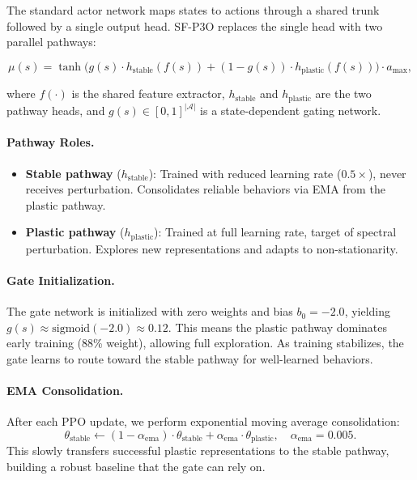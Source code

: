 \documentclass{article}
\begin{document}
The standard actor network maps states to actions through a shared trunk followed by a single output head. SF-P3O replaces the single head with two parallel pathways:

\begin{equation}
    \mu(s) = \tanh\!\Big(g(s) \cdot h_{\text{stable}}(f(s)) + (1 - g(s)) \cdot h_{\text{plastic}}(f(s))\Big) \cdot a_{\max},
    \label{eq:dual_pathway}
\end{equation}

where $f(\cdot)$ is the shared feature extractor, $h_{\text{stable}}$ and $h_{\text{plastic}}$ are the two pathway heads, and $g(s) \in [0,1]^{|\mathcal{A}|}$ is a state-dependent gating network.

\paragraph{Pathway Roles.}
\begin{itemize}
    \item \textbf{Stable pathway} ($h_{\text{stable}}$): Trained with reduced learning rate ($0.5\times$), never receives perturbation. Consolidates reliable behaviors via EMA from the plastic pathway.
    \item \textbf{Plastic pathway} ($h_{\text{plastic}}$): Trained at full learning rate, target of spectral perturbation. Explores new representations and adapts to non-stationarity.
\end{itemize}

\paragraph{Gate Initialization.}
The gate network is initialized with zero weights and bias $b_0 = -2.0$, yielding $g(s) \approx \text{sigmoid}(-2.0) \approx 0.12$. This means the plastic pathway dominates early training (88\% weight), allowing full exploration. As training stabilizes, the gate learns to route toward the stable pathway for well-learned behaviors.

\paragraph{EMA Consolidation.}
After each PPO update, we perform exponential moving average consolidation:
\begin{equation}
    \theta_{\text{stable}} \leftarrow (1 - \alpha_{\text{ema}}) \cdot \theta_{\text{stable}} + \alpha_{\text{ema}} \cdot \theta_{\text{plastic}}, \quad \alpha_{\text{ema}} = 0.005.
\end{equation}
This slowly transfers successful plastic representations to the stable pathway, building a robust baseline that the gate can rely on.
\end{document}
